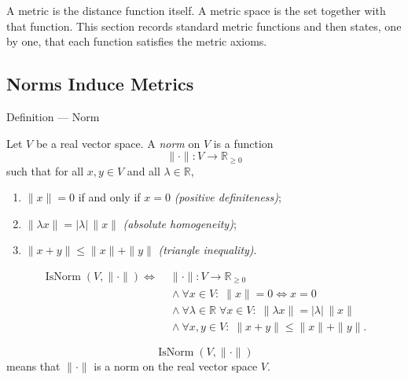 \begin{remark*}[Exposition]
A metric is the distance function itself.  A metric space is the set together
with that function.  This section records standard metric functions and then
states, one by one, that each function satisfies the metric axioms.
\end{remark*}

\subsection{Norms Induce Metrics}

\begin{definitionbox}{Definition --- Norm}
\begin{definition}[Norm]\label{def:norm-on-real-vector-space}
Let \(V\) be a real vector space.  A \emph{norm} on \(V\) is a function
\[
  \|\cdot\|:V\to\mathbb{R}_{\geq 0}
\]
such that for all \(x,y\in V\) and all \(\lambda\in\mathbb{R}\),
\begin{enumerate}
  \item \(\|x\|=0\) if and only if \(x=0\)
        \hfill\textit{(positive definiteness)};
  \item \(\|\lambda x\|=|\lambda|\,\|x\|\)
        \hfill\textit{(absolute homogeneity)};
  \item \(\|x+y\|\leq \|x\|+\|y\|\)
        \hfill\textit{(triangle inequality)}.
\end{enumerate}
\end{definition}
\end{definitionbox}

\begin{remark*}
\[
\begin{aligned}
\operatorname{IsNorm}(V,\|\cdot\|)
\Longleftrightarrow\;
&\|\cdot\|:V\to\mathbb{R}_{\geq 0}
\\
&{}\land
\forall x\in V{:}\; \|x\|=0 \Longleftrightarrow x=0
\\
&{}\land
\forall \lambda\in\mathbb{R}\;\forall x\in V{:}\;
\|\lambda x\|=|\lambda|\,\|x\|
\\
&{}\land
\forall x,y\in V{:}\; \|x+y\|\leq \|x\|+\|y\|.
\end{aligned}
\]
\end{remark*}

\begin{remark*}
\[
\operatorname{IsNorm}(V,\|\cdot\|)
\]
means that \(\|\cdot\|\) is a norm on the real vector space \(V\).
\end{remark*}

